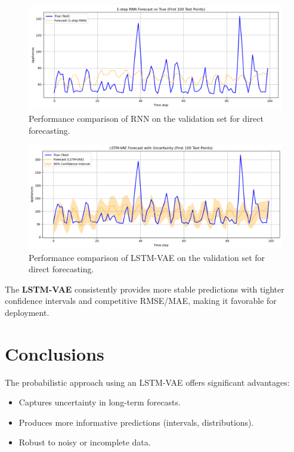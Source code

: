 \documentclass{article}
\begin{document}
\begin{figure}[h!]
    \centering
    \includegraphics[width=1\textwidth]{pics/rnn1step.png}
    \caption{Performance comparison of RNN on the validation set for direct forecasting.}
    \label{fig:direct_forecasting_comparison}
\end{figure}

\begin{figure}[h!]
    \centering
    \includegraphics[width=1\textwidth]{pics/lstm1step.png}
    \caption{Performance comparison of LSTM-VAE on the validation set for direct forecasting.}
    \label{fig:direct_forecasting_error}
\end{figure}

The \textbf{LSTM-VAE} consistently provides more stable predictions with tighter confidence intervals and competitive RMSE/MAE, making it favorable for deployment.

\section{Conclusions}
The probabilistic approach using an LSTM-VAE offers significant advantages:
\begin{itemize}
  \item Captures uncertainty in long-term forecasts.
  \item Produces more informative predictions (intervals, distributions).
  \item Robust to noisy or incomplete data.
\end{itemize}
\end{document}
